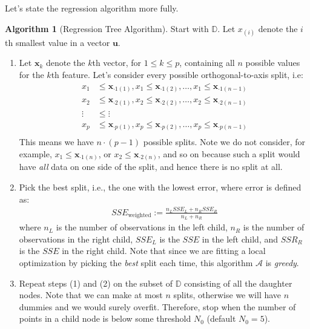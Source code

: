 \documentclass[12pt, a4paper]{article}
\theoremstyle{definition}
\newtheorem{algorithm}{Algorithm}
\begin{document}
	Let's state the regression algorithm more fully.
	\begin{tcolorbox}[breakable]
		\begin{algorithm}[Regression Tree Algorithm]
			
			\label{alg:regression-tree-alg}
			Start with $\mathbb{D}$. Let $x_{(i)}$ denote the $i$th smallest
			value in a vector $\bm{u}$.
			\begin{enumerate}[label=(\arabic*)]
				\item Let $\bm{x}_k$ denote the $k$th vector, for $1\leq k\leq p$,
				containing all $n$ possible values for the $k$th feature.
				Let's consider every possible orthogonal-to-axis split, i.e:
				\begin{align*}
					x_1&\leq \bm{x}_{\cdot 1(1)}, x_1 \leq \bm{x}_{\cdot 1(2)}, \ldots, x_1 \leq \bm{x}_{\cdot 1(n-1)}\\
					x_2&\leq \bm{x}_{\cdot 2(1)}, x_2 \leq \bm{x}_{\cdot 2(2)}, \ldots, x_2 \leq \bm{x}_{\cdot 2(n-1)}\\
					\vdots &\leq  \vdots \\
					x_p&\leq \bm{x}_{\cdot p(1)}, x_p \leq \bm{x}_{\cdot p(2)}, \ldots, x_p \leq \bm{x}_{\cdot p(n-1)}\\
				\end{align*}
				This means we have $n\cdot (p-1)$ possible splits. Note we do not
				consider, for example, $x_1\leq \bm{x}_{\cdot 1(n)}$,
				or $x_2\leq \bm{x}_{\cdot 2(n)}$, and so on because such a split
				would have \textit{all} data on one side of the split, and hence
				there is no split at all.
				\item Pick the best split, i.e., the one with the lowest error,
				where error is defined as:
				\begin{align*}
					SSE_{\text{weighted}} := \frac{n_L SSE_L + n_R SSE_R}{n_L + n_R}
				\end{align*}
				where $n_L$ is the number of observations in the left child,
				$n_R$ is the number of observations in the right child, $SSE_L$
				is the $SSE$ in the left child, and $SSR_R$ is the $SSE$ in
				the right child. Note that since we are fitting a local
				optimization by picking the \textit{best} split each time, this
				algorithm $\mathcal{A}$ is \textit{greedy}.
				\item Repeat steps (1) and (2) on the subset of $\mathbb{D}$
				consisting of all the daughter nodes. Note that we can make
				at most $n$ splits, otherwise we will have $n$ dummies and we
				would surely overfit. Therefore, stop when the number of points
				in a child node is below some threshold $N_0$ (default $N_0 = 5$).
			\end{enumerate}
		\end{algorithm}
	\end{tcolorbox}
\end{document}
